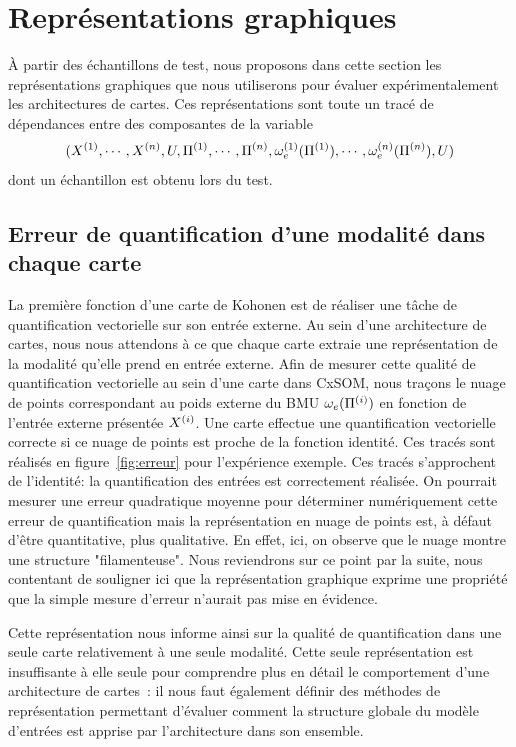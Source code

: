 \documentclass[../main]{subfiles}
\begin{document}
\section{Représentations graphiques}
\`A partir des échantillons de test, nous proposons dans cette section les représentations graphiques que nous utiliserons pour évaluer expérimentalement les architectures de cartes.
Ces représentations sont toute un tracé de dépendances entre des composantes de la variable $$(X^{({1})}, \cdots, X^{({n})}, U, \Pi^{({1})}, \cdots, \Pi^{({n})}, \omega_e^{({1})}(\Pi^{({1})}), \cdots, \omega_e^{({n})}(\Pi^{({n})}),U)$$ dont un échantillon est obtenu lors du test.

\subsection{Erreur de quantification d'une modalité dans chaque carte}

La première fonction d'une carte de Kohonen est de réaliser une tâche de quantification vectorielle sur son entrée externe. Au sein d'une architecture de cartes, nous nous attendons à ce que chaque carte extraie une représentation de la modalité qu'elle prend en entrée externe.
Afin de mesurer cette qualité de quantification vectorielle au sein d'une carte dans CxSOM, nous traçons le nuage de points correspondant au poids externe du BMU $\omega_e(\Pi^{({i})})$ en fonction de l'entrée externe présentée $X^{({i})}$. Une carte effectue une quantification vectorielle correcte si ce nuage de points est proche de la fonction identité.
Ces tracés sont réalisés en figure~\ref{fig:erreur} pour l'expérience exemple. Ces tracés s'approchent de l'identité: la quantification des entrées est correctement réalisée.
On pourrait mesurer une erreur quadratique moyenne pour déterminer numériquement cette erreur de quantification mais la représentation en nuage de points est, à défaut d'être quantitative, plus qualitative. En effet, ici, on observe que le nuage montre une structure "filamenteuse". Nous reviendrons sur ce point par la suite, nous contentant de souligner ici que la représentation graphique exprime une propriété que la simple mesure d'erreur n'aurait pas mise en évidence. 

Cette représentation nous informe ainsi sur la qualité de quantification dans une seule carte relativement à une seule modalité. Cette seule représentation est insuffisante à elle seule pour comprendre plus en détail le comportement d'une architecture de cartes~: il nous faut également définir des méthodes de représentation permettant d'évaluer comment la structure globale du modèle d'entrées est apprise par l'architecture dans son ensemble.
\end{document}
